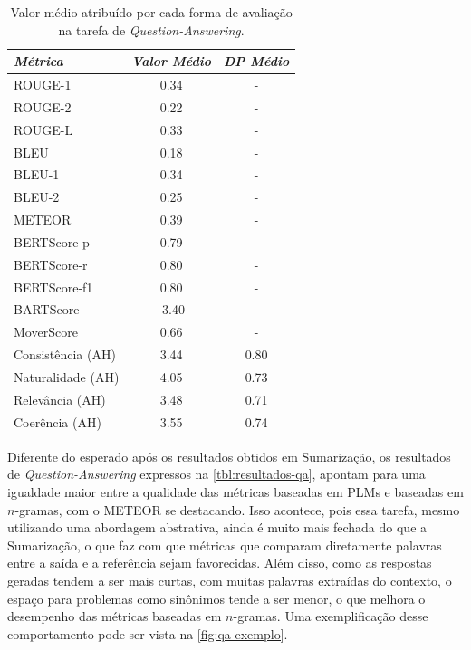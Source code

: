 \documentclass[cic,tc]{iiufrgs}
\begin{document}
\begin{table}[htbp]
    \caption{Valor médio atribuído por cada forma de avaliação na tarefa de \textit{Question-Answering}.}
    \centering
        \begin{tabular}{l c c}
          \hline
          \textit{Métrica} & \textit{Valor Médio} & \textit{DP Médio}\\
          \hline
          \hline
          ROUGE-1 & 0.34 & -\\
          ROUGE-2 & 0.22 & -\\
          ROUGE-L & 0.33 & -\\
          BLEU    & 0.18 & -\\
          BLEU-1  & 0.34 & -\\
          BLEU-2  & 0.25 & -\\
          METEOR  & 0.39 & -\\
          \hline
          BERTScore-p  &  0.79 & -\\
          BERTScore-r  &  0.80 & -\\
          BERTScore-f1 &  0.80 & -\\
          BARTScore    & -3.40 & -\\
          MoverScore   &  0.66 & -\\
          \hline
          Consistência (AH) & 3.44 & 0.80\\
          Naturalidade (AH) & 4.05 & 0.73\\
          Relevância (AH)   & 3.48 & 0.71\\
          Coerência (AH)    & 3.55 & 0.74\\
          \hline
        \end{tabular}
    \label{tbl:avg-métricas-qa}
\end{table}

Diferente do esperado após os resultados obtidos em Sumarização, os resultados de \textit{Question-Answering} expressos na \autoref{tbl:resultados-qa}, apontam para uma igualdade maior entre a qualidade das métricas baseadas em PLMs e baseadas em $n$-gramas, com o METEOR \cite{banerjee2005meteor} se destacando. Isso acontece, pois essa tarefa, mesmo utilizando uma abordagem abstrativa, ainda é muito mais fechada do que a Sumarização, o que faz com que métricas que comparam diretamente palavras entre a saída e a referência sejam favorecidas. 
Além disso, como as respostas geradas tendem a ser mais curtas, com muitas palavras extraídas do contexto, o espaço para problemas como sinônimos tende a ser menor, o que melhora o desempenho das métricas baseadas em $n$-gramas. Uma exemplificação desse comportamento pode ser vista na \autoref{fig:qa-exemplo}.
\end{document}
